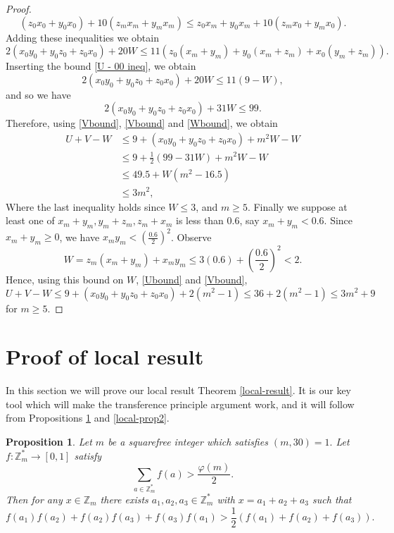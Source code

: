 \documentclass[a4paper,11pt,twoside]{amsart}
\newtheorem{proposition}[theorem]{Proposition}
\theoremstyle{definition}
\numberwithin{equation}{section}
\newcommand\Z{\mathbb{Z}}
\begin{document}
\begin{proof}
$$(z_0x_0 + y_0x_0)+10(z_mx_m + y_mx_m) \leq z_0x_m + y_0x_m + 10(z_mx_0 + y_mx_0).$$
Adding these inequalities we obtain \begin{equation*}
    2(x_0y_0 + y_0z_0 + z_0x_0) + 20W \leq 11(z_0(x_m + y_m) + y_0(x_m + z_m) + x_0(y_m + z_m)).
\end{equation*}
Inserting the bound \eqref{U - 00 ineq}, we obtain $$ 2(x_0y_0 + y_0z_0 + z_0x_0) + 20W \leq 11(9-W),$$
and so we have
\begin{equation} \label{Wbound}
        2(x_0y_0 + y_0z_0 + z_0x_0) + 31W \leq 99.
\end{equation}
Therefore, using \eqref{Vbound}, \eqref{Vbound} and \eqref{Wbound}, we obtain \begin{align*}
    U + V - W &\leq 9 + (x_0y_0 + y_0z_0 + z_0x_0) + m^2W - W \\
    & \leq 9 + \frac{1}{2}(99-31W) + m^2W - W \\
    & \leq 49.5 + W(m^2 - 16.5) \\
    & \leq 3m^2, 
\end{align*}
Where the last inequality holds since $W \leq 3$, and $m \geq 5.$
Finally we suppose at least one of $x_m + y_m, y_m + z_m, z_m + x_m$ is less than $0.6$, say $x_m + y_m < 0.6.$ Since $x_m + y_m \geq 0$, we have $x_my_m < (\frac{0.6}{2})^2$. Observe $$W = z_m(x_m + y_m) + x_my_m \leq 3(0.6) + (\frac{0.6}{2})^2 < 2.$$ Hence, using this bound on $W$, \eqref{Ubound} and \eqref{Vbound}, $$U + V - W \leq 9 + (x_0y_0 + y_0z_0 + z_0x_0) + 2(m^2 - 1) \leq 36 + 2(m^2-1) \leq 3m^2 + 9$$ for $m \geq 5.$
\end{proof}


\section{Proof of local result}\label{sec3}
In this section we will prove our local result Theorem  \ref{local-result}. It is our key tool which will make the transference principle argument work, and it will follow from Propositions \ref{local-prop1} and \ref{local-prop2}. 


\begin{proposition}\label{local-prop1}
Let $m$ be a squarefree integer which satisfies $(m,30) = 1.$ Let $f: \Z_m^* \rightarrow [0,1]$ satisfy $$\sum_{a \in \Z_m^*}f(a) > \frac{\varphi(m)}{2}.$$ Then for any $x \in \Z_m$ there exists $a_1,a_2,a_3 \in \Z_m^*$ with $x = a_1 + a_2 + a_3$ such that $$f(a_1)f(a_2) + f(a_2)f(a_3) + f(a_3)f(a_1) > \frac{1}{2}(f(a_1) + f(a_2) + f(a_3)).$$
\end{proposition} 
\end{document}
